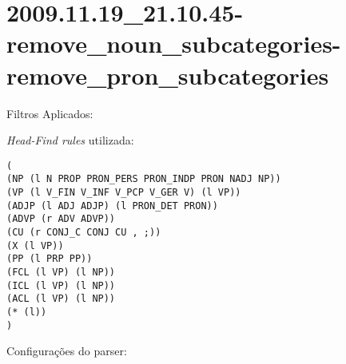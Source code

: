 \section{2009.11.19_21.10.45-remove_noun_subcategories-remove_pron_subcategories} %
\label{sec:exp:2009.11.19_21.10.45-remove_noun_subcategories-remove_pron_subcategories}

Filtros Aplicados:

\begin{itemize}
  
  \item{\emph{RemoveNounSubcategories}
  
  \item{\emph{RemovePronSubcategories}
  
\end{itemize}

\emph{Head-Find rules} utilizada:

\scriptsize
\begin{verbatim}
(
(NP (l N PROP PRON_PERS PRON_INDP PRON NADJ NP))
(VP (l V_FIN V_INF V_PCP V_GER V) (l VP))
(ADJP (l ADJ ADJP) (l PRON_DET PRON))
(ADVP (r ADV ADVP))
(CU (r CONJ_C CONJ CU , ;))
(X (l VP))
(PP (l PRP PP))
(FCL (l VP) (l NP))
(ICL (l VP) (l NP))
(ACL (l VP) (l NP))
(* (l))
)

\end{verbatim}

\normalsize

Configurações do parser:

